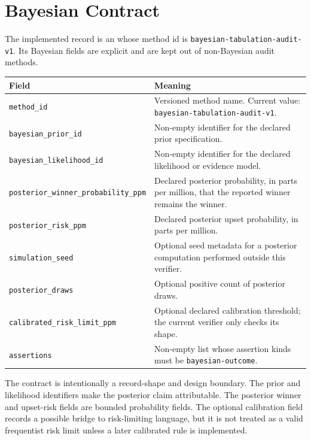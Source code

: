 \section{Bayesian Contract}

The implemented record is an  whose method id is
\texttt{bayesian-tabulation-audit-v1}. Its Bayesian fields are explicit and are
kept out of non-Bayesian audit methods.

\begin{center}
\small
\begin{tabularx}{\textwidth}{lX}
\toprule
Field & Meaning \\
\midrule
\texttt{method\_id} & Versioned method name. Current value: \texttt{bayesian-tabulation-audit-v1}. \\
\texttt{bayesian\_prior\_id} & Non-empty identifier for the declared prior specification. \\
\texttt{bayesian\_likelihood\_id} & Non-empty identifier for the declared likelihood or evidence model. \\
\texttt{posterior\_winner\_probability\_ppm} & Declared posterior probability, in parts per million, that the reported winner remains the winner. \\
\texttt{posterior\_risk\_ppm} & Declared posterior upset probability, in parts per million. \\
\texttt{simulation\_seed} & Optional seed metadata for a posterior computation performed outside this verifier. \\
\texttt{posterior\_draws} & Optional positive count of posterior draws. \\
\texttt{calibrated\_risk\_limit\_ppm} & Optional declared calibration threshold; the current verifier only checks its shape. \\
\texttt{assertions} & Non-empty list whose assertion kinds must be \texttt{bayesian-outcome}. \\
\bottomrule
\end{tabularx}
\end{center}

The contract is intentionally a record-shape and design boundary. The prior and
likelihood identifiers make the posterior claim attributable. The posterior
winner and upset-risk fields are bounded probability fields. The optional
calibration field records a possible bridge to risk-limiting language, but it
is not treated as a valid frequentist risk limit unless a later calibrated rule
is implemented.
